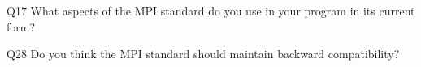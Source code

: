 \begin{description}%
\item{Q17} What aspects of the MPI standard do you use in your program in its current form?%
\item{Q28} Do you think the MPI standard should maintain backward compatibility?%
\end{description}%
